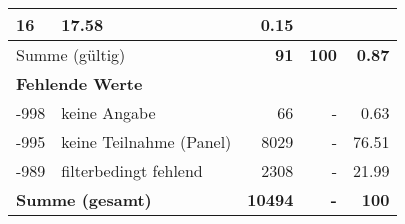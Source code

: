 \begin{longtable}{lXrrr}
       \num{16} &
       \num[round-mode=places,round-precision=2]{17.58} &
         \num[round-mode=places,round-precision=2]{0.15} \\
     \midrule
     \multicolumn{2}{l}{Summe (gültig)} &
       \textbf{\num{91}} &
     \textbf{\num{100}} &
       \textbf{\num[round-mode=places,round-precision=2]{0.87}} \\
     \multicolumn{5}{l}{\textbf{Fehlende Werte}}\\
       -998 &
       keine Angabe &
         \num{66} &
        - &
         \num[round-mode=places,round-precision=2]{0.63} \\
       -995 &
       keine Teilnahme (Panel) &
         \num{8029} &
        - &
         \num[round-mode=places,round-precision=2]{76.51} \\
       -989 &
       filterbedingt fehlend &
         \num{2308} &
        - &
         \num[round-mode=places,round-precision=2]{21.99} \\
     \midrule
     \multicolumn{2}{l}{\textbf{Summe (gesamt)}} &
          \textbf{\num{10494}} &
        \textbf{-} &
        \textbf{\num{100}} \\
     \bottomrule
     \end{longtable}
     

